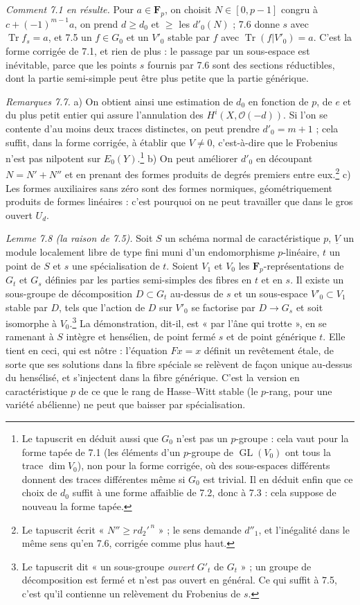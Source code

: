 \documentclass[11pt,a4paper]{article}
\begin{document}
\emph{Comment 7.1 en résulte.} Pour $a \in \mathbf{F}_p$, on choisit $N \in [0,
p-1]$ congru à $c + (-1)^{m-1}a$, on prend $d \geqslant d_0$ et $\geqslant$ les
$d'_0(N)$ ; 7.6 donne $s$ avec $\operatorname{Tr} f_s = a$, et 7.5 un $f \in G_0$
et un $V'_0$ stable par $f$ avec $\operatorname{Tr}(f|V'_0) = a$. C'est la forme
corrigée de 7.1, et rien de plus : le passage par un sous-espace est inévitable,
parce que les points $s$ fournis par 7.6 sont des sections réductibles, dont la
partie semi-simple peut être plus petite que la partie générique.

\emph{Remarques 7.7.} a) On obtient ainsi une estimation de $d_0$ en fonction de
$p$, de $e$ et du plus petit entier qui assure l'annulation des $H^i(X,
\mathcal{O}(-d))$. Si l'on se contente d'au moins deux traces distinctes, on peut
prendre $d'_0 = m+1$ ; cela suffit, dans la forme corrigée, à établir que
$V \neq 0$, c'est-à-dire que le Frobenius n'est pas nilpotent sur
$E_0(Y)$.\footnote{Le tapuscrit en déduit aussi que $G_0$ n'est pas un
$p$-groupe : cela vaut pour la forme tapée de 7.1 (les éléments d'un $p$-groupe
de $\operatorname{GL}(V_0)$ ont tous la trace $\dim V_0$), non pour la forme
corrigée, où des sous-espaces différents donnent des traces différentes même si
$G_0$ est trivial. Il en déduit enfin que ce choix de $d_0$ suffit à une forme
affaiblie de 7.2, donc à 7.3 : cela suppose de nouveau la forme tapée.} b) On
peut améliorer $d'_0$ en découpant $N = N' + N''$ et en prenant des formes
produits de degrés premiers entre eux.\footnote{Le tapuscrit écrit « $N''
\geqslant r d_2'^{\,n}$ » ; le sens demande $d''_1$, et l'inégalité dans le même
sens qu'en 7.6, corrigée comme plus haut.} c) Les formes auxiliaires sans zéro
sont des formes normiques, géométriquement produits de formes linéaires : c'est
pourquoi on ne peut travailler que dans le gros ouvert $U_d$.

\emph{Lemme 7.8 (la raison de 7.5).} Soit $S$ un schéma normal de
caractéristique $p$, $\underline{V}$ un module localement libre de type fini muni
d'un endomorphisme $p$-linéaire, $t$ un point de $S$ et $s$ une spécialisation de
$t$. Soient $V_1$ et $V_0$ les $\mathbf{F}_p$-représentations de $G_t$ et $G_s$
définies par les parties semi-simples des fibres en $t$ et en $s$. Il existe un
sous-groupe de décomposition $D \subset G_t$ au-dessus de $s$ et un sous-espace
$V'_0 \subset V_1$ stable par $D$, tels que l'action de $D$ sur $V'_0$ se factorise
par $D \to G_s$ et soit isomorphe à $V_0$.\footnote{Le tapuscrit dit « un
sous-groupe \emph{ouvert} $G'_t$ de $G_t$ » ; un groupe de décomposition est
fermé et n'est pas ouvert en général. Ce qui suffit à 7.5, c'est qu'il contienne
un relèvement du Frobenius de $s$.} La démonstration, dit-il, est « par l'âne qui
trotte », en se ramenant à $S$ intègre et hensélien, de point fermé $s$ et de point
générique $t$. Elle tient en ceci, qui est nôtre : l'équation $Fx = x$ définit un
revêtement étale, de sorte que ses solutions dans la fibre spéciale se relèvent de
façon unique au-dessus du hensélisé, et s'injectent dans la fibre générique. C'est
la version en caractéristique $p$ de ce que le rang de Hasse--Witt stable (le
$p$-rang, pour une variété abélienne) ne peut que baisser par spécialisation.
\end{document}
